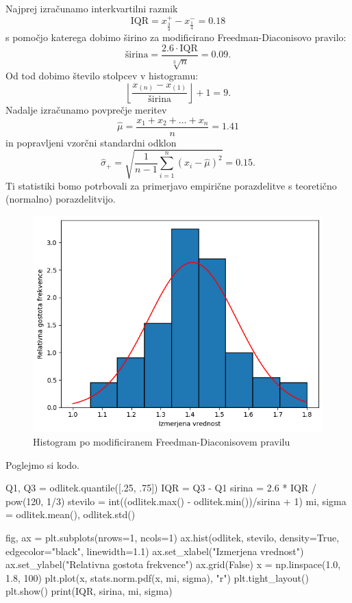\documentclass[10pt, a4paper]{article}
\begin{document}
Najprej izračunamo interkvartilni razmik 
$$\mathrm{IQR} = x^+ _{\frac{3}{4}} - x^- _{\frac{1}{4}} = 0.18$$
s pomočjo katerega dobimo širino za modificirano Freedman-Diaconisovo pravilo:
$$\mathrm{širina} = \frac{2.6 \cdot \mathrm{IQR}}{\sqrt[3]{n}} = 0.09.$$
Od tod dobimo število stolpcev v histogramu:
$$\left\lfloor \frac{x_{(n)} - x_{(1)}}{\mathrm{širina}} \right\rfloor + 1 = 9.$$
Nadalje izračunamo povprečje meritev
$$\widehat{\mu} = \frac{x_1 + x_2 + \dots + x_n}{n} = 1.41$$
in popravljeni vzorčni standardni odklon 
$$\widehat{\sigma}_+ = \sqrt{\frac{1}{n - 1} \sum_{i = 1} ^n (x_i - \widehat{\mu})^2} = 0.15.$$
Ti statistiki bomo potrbovali za primerjavo empirične porazdelitve s teoretično (normalno) porazdelitvijo.

\begin{figure}[H]
    \centering
    \includegraphics[scale=0.75]{Images/2a.png}
    \caption{Histogram po modificiranem Freedman-Diaconisovem pravilu}
\end{figure}

Poglejmo si kodo.

\begin{python}
    Q1, Q3 = odlitek.quantile([.25, .75])
    IQR = Q3 - Q1
    sirina = 2.6 * IQR / pow(120, 1/3)
    stevilo = int((odlitek.max() - odlitek.min())/sirina + 1)
    mi, sigma = odlitek.mean(), odlitek.std()

    fig, ax = plt.subplots(nrows=1, ncols=1)
    ax.hist(odlitek, stevilo, density=True, edgecolor="black", linewidth=1.1)
    ax.set_xlabel("Izmerjena vrednost")
    ax.set_ylabel("Relativna gostota frekvence")
    ax.grid(False)
    x = np.linspace(1.0, 1.8, 100)
    plt.plot(x, stats.norm.pdf(x, mi, sigma), "r")
    plt.tight_layout()
    plt.show()
    print(IQR, sirina, mi, sigma)
\end{python}
\end{document}
